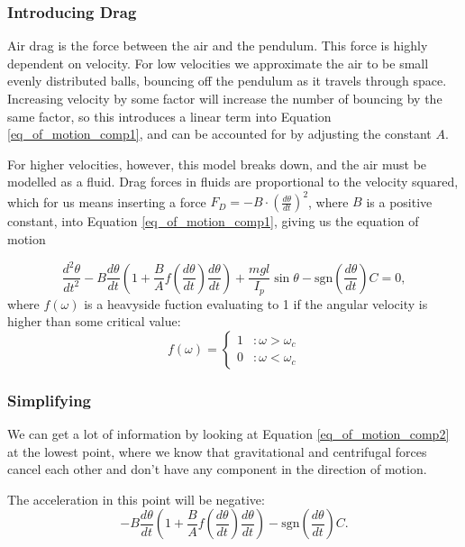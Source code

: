 \documentclass[11pt, a4paper]{article}
\begin{document}
\subsubsection{Introducing Drag}
Air drag is the force between the air and the pendulum. 
This force is highly dependent on velocity.
For low velocities we approximate the air to be small evenly distributed balls,
bouncing off the
pendulum as it travels through space. 
Increasing velocity by some factor will increase the number of bouncing by the same
factor, so this introduces a linear term into 
Equation \ref{eq_of_motion_comp1}, and can be accounted for by adjusting the constant
$A$.

For higher velocities, however, this model breaks down, and the air must be
modelled as a fluid. Drag forces in fluids are proportional to the velocity
squared\cite{drag}, which for us means inserting a force 
$F_D = -B\cdot \left(\frac{d\theta}{dt}\right)^2$, where $B$ is a positive constant,
into Equation \ref{eq_of_motion_comp1}, giving us the equation of motion

\begin{equation}
    \frac{d^2\theta}{dt^2} 
  - B \frac{d\theta}{dt}
  \left(1 + \frac{B}{A}f(\frac{d\theta}{dt}) \frac{d\theta}{dt} \right)  
  + \frac{mgl}{I_p}\sin{\theta} 
  - \text{sgn}\left(\frac{d\theta}{dt}\right)C
  = 0,
  \label{eq_of_motion_comp2}
\end{equation}
where $f(\omega)$ is a heavyside fuction evaluating to 1 if the angular
velocity is higher than some critical value:
\begin{equation}
f(\omega) = \left\{
  \begin{array}{lr}
    1 & : \omega > \omega_{c}\\
    0 & : \omega < \omega_{c}
  \end{array}
\right.
\end{equation}


\subsubsection{Simplifying}

We can get a lot of information by looking at Equation \ref{eq_of_motion_comp2}
at the lowest point, where we know that gravitational and centrifugal forces
cancel each other and don't have any component in the direction of motion.

The acceleration in this point will be negative:
\begin{equation}
  - B \frac{d\theta}{dt}
  \left(1 + \frac{B}{A}f(\frac{d\theta}{dt}) \frac{d\theta}{dt} \right)  
  - \text{sgn}\left(\frac{d\theta}{dt}\right)C.
\end{equation}  
\end{document}
